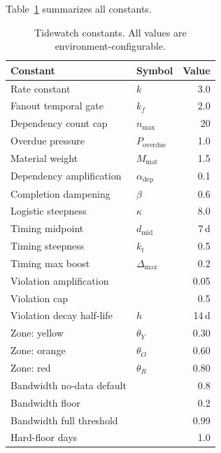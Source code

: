 \documentclass[11pt]{article}
\begin{document}
Table~\ref{tab:constants} summarizes all constants.

\begin{table}[t]
\centering
\caption{Tidewatch constants.  All values are environment-configurable.}
\label{tab:constants}
\begin{tabular}{@{}llr@{}}
\toprule
\textbf{Constant} & \textbf{Symbol} & \textbf{Value} \\
\midrule
Rate constant             & $k$                      & 3.0  \\
Fanout temporal gate      & $k_f$                    & 2.0  \\
Dependency count cap      & $n_{\text{max}}$         & 20   \\
Overdue pressure          & $P_{\text{overdue}}$     & 1.0  \\
Material weight           & $M_{\text{mat}}$         & 1.5  \\
Dependency amplification  & $\alpha_{\text{dep}}$    & 0.1  \\
Completion dampening      & $\beta$                  & 0.6  \\
Logistic steepness        & $\kappa$                 & 8.0  \\
Timing midpoint           & $d_{\text{mid}}$         & 7\,d \\
Timing steepness          & $k_t$                    & 0.5  \\
Timing max boost          & $\Delta_{\max}$          & 0.2  \\
Violation amplification   &                          & 0.05 \\
Violation cap             &                          & 0.5  \\
Violation decay half-life & $h$                      & 14\,d \\
\midrule
Zone: yellow              & $\theta_Y$               & 0.30 \\
Zone: orange              & $\theta_O$               & 0.60 \\
Zone: red                 & $\theta_R$               & 0.80 \\
\midrule
Bandwidth no-data default &                          & 0.8  \\
Bandwidth floor           &                          & 0.2  \\
Bandwidth full threshold  &                          & 0.99 \\
Hard-floor days           &                          & 1.0  \\
\bottomrule
\end{tabular}
\end{table}
\end{document}
